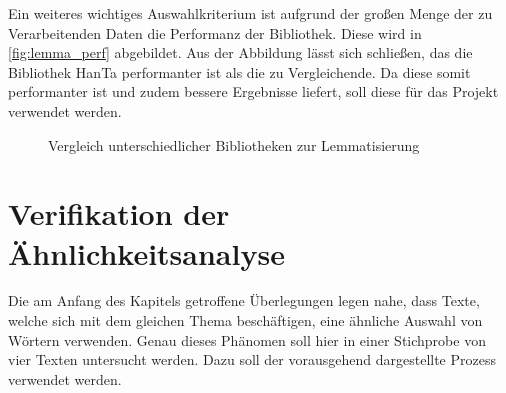 Ein weiteres wichtiges Auswahlkriterium ist aufgrund der großen Menge der zu Verarbeitenden Daten die Performanz der Bibliothek. Diese wird in \ref{fig:lemma_perf} abgebildet. Aus der Abbildung lässt sich schließen, das die Bibliothek HanTa performanter ist als die zu Vergleichende. Da diese somit performanter ist und zudem bessere Ergebnisse liefert, soll diese für das Projekt verwendet werden.
\begin{figure}
	\centering
	
	\caption{Vergleich unterschiedlicher Bibliotheken zur Lemmatisierung}

\end{figure}
\section{Verifikation der Ähnlichkeitsanalyse}
Die am Anfang des Kapitels getroffene Überlegungen legen nahe, dass Texte, welche sich mit dem gleichen Thema beschäftigen, eine ähnliche Auswahl von Wörtern verwenden. Genau dieses Phänomen soll hier in einer Stichprobe von vier Texten untersucht werden. Dazu soll der vorausgehend dargestellte Prozess verwendet werden.  
